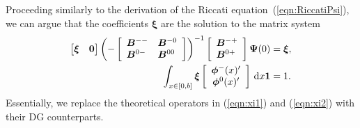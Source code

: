 Proceeding similarly to the derivation of the Riccati equation~(\ref{eqn:RiccatiPsi}), we can argue that the coefficients \( {\boldsymbol{\xi}}\) are the solution to the matrix system 
% 	 
	\begin{align*}
		\begin{bmatrix}  {\boldsymbol{\xi}}  & \boldsymbol{0} \end{bmatrix}\left(-\left[\begin{array}{ll} 
			 { {\boldsymbol B}}^{--} &  { {\boldsymbol B}}^{-0} \\
                         { {\boldsymbol B}}^{0-} &  { {\boldsymbol B}}^{00} 
		\end{array} \right]\right)^{-1}\left[\begin{array}{l} 
			 { {\boldsymbol B}}^{-+} \\ 
			 { {\boldsymbol B}}^{0+}
		\end{array} \right]\boldsymbol \Psi(0) & =  {\boldsymbol{\xi}}, \\ 
		\int_{x\in[0,b]} {\boldsymbol \xi}\left[\begin{array}{c}\boldsymbol \phi^-(x)'{} \\ \boldsymbol \phi^0(x)'{}\end{array}\right]\, \mathrm{d} x \boldsymbol 1 & = 1. 
	\end{align*} 
Essentially, we replace the theoretical operators in (\ref{eqn:xi1}) and (\ref{eqn:xi2}) with their DG counterparts. 

